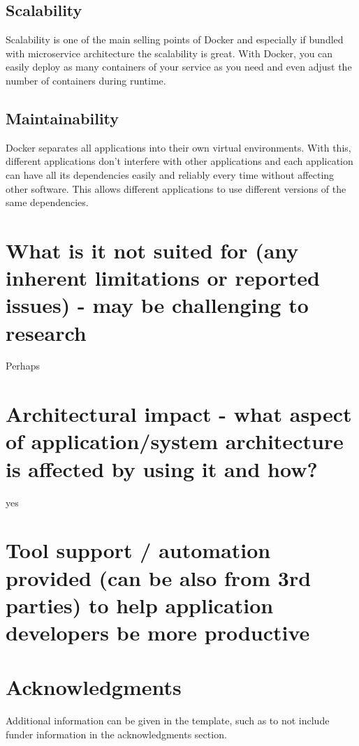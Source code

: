 \documentclass[fleqn,12pt]{olplainarticle}
\begin{document}
\subsection*{Scalability}
Scalability is one of the main selling points of Docker and especially if bundled with microservice architecture the scalability is great. With Docker, you can easily deploy as many containers of your service as you need and even adjust the number of containers during runtime.
\subsection*{Maintainability}
Docker separates all applications into their own virtual environments. With this, different applications don't interfere with other applications and each application can have all its dependencies easily and reliably every time without affecting other software. This allows different applications to use different versions of the same dependencies.

\section*{What is it not suited for (any inherent limitations or reported issues) - may be challenging to research}

Perhaps

\section*{Architectural impact - what aspect of application/system architecture is affected by using it and how?}
yes
\section*{Tool support / automation provided (can be also from 3rd parties) to help application developers be more productive}

\section*{Acknowledgments}

Additional information can be given in the template, such as to not include funder information in the acknowledgments section.


\end{document}
